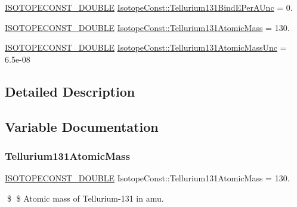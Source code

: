 \begin{DoxyCompactItemize}
\mbox{\hyperlink{group___isotope_const-_macros_ga8f45a7272ce02c0b4c65c44636ed719a}{I\+S\+O\+T\+O\+P\+E\+C\+O\+N\+S\+T\+\_\+\+D\+O\+U\+B\+LE}} \mbox{\hyperlink{group___isotope_const-_tellurium-_te131_ga34f0e8e7011495ce2024c457100c845f}{Isotope\+Const\+::\+Tellurium131\+Bind\+E\+Per\+A\+Unc}} = 0.
\item 
\mbox{\hyperlink{group___isotope_const-_macros_ga8f45a7272ce02c0b4c65c44636ed719a}{I\+S\+O\+T\+O\+P\+E\+C\+O\+N\+S\+T\+\_\+\+D\+O\+U\+B\+LE}} \mbox{\hyperlink{group___isotope_const-_tellurium-_te131_ga1b386e0b48d048d1d2861ab1ab524af9}{Isotope\+Const\+::\+Tellurium131\+Atomic\+Mass}} = 130.
\item 
\mbox{\hyperlink{group___isotope_const-_macros_ga8f45a7272ce02c0b4c65c44636ed719a}{I\+S\+O\+T\+O\+P\+E\+C\+O\+N\+S\+T\+\_\+\+D\+O\+U\+B\+LE}} \mbox{\hyperlink{group___isotope_const-_tellurium-_te131_gaa2d0d6b24d1274b6f6dedb150ff0aa25}{Isotope\+Const\+::\+Tellurium131\+Atomic\+Mass\+Unc}} = 6.\+5e-\/08
\end{DoxyCompactItemize}


\subsection{Detailed Description}


\subsection{Variable Documentation}
\mbox{\label{group___isotope_const-_tellurium-_te131_ga1b386e0b48d048d1d2861ab1ab524af9}} 
\subsubsection{\texorpdfstring{Tellurium131\+Atomic\+Mass}{Tellurium131AtomicMass}}
{\footnotesize\ttfamily \mbox{\hyperlink{group___isotope_const-_macros_ga8f45a7272ce02c0b4c65c44636ed719a}{I\+S\+O\+T\+O\+P\+E\+C\+O\+N\+S\+T\+\_\+\+D\+O\+U\+B\+LE}} Isotope\+Const\+::\+Tellurium131\+Atomic\+Mass = 130.}

\$ \$ Atomic mass of Tellurium-\/131 in amu. \mbox{\label{group___isotope_const-_tellurium-_te131_gaa2d0d6b24d1274b6f6dedb150ff0aa25}} 
